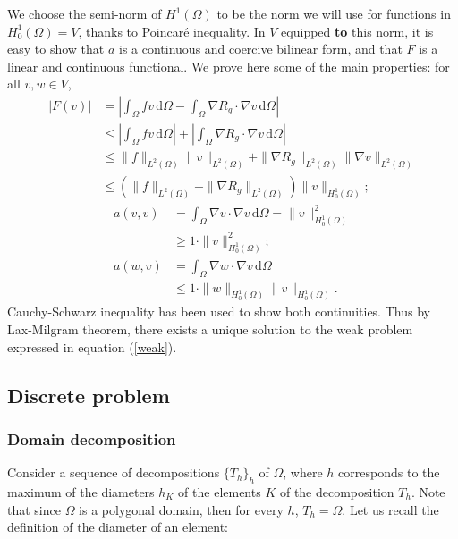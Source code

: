 We choose the semi-norm of $H^1(\Omega)$ to be the norm we will use for functions in $H^1_0(\Omega) = V$, thanks to Poincaré inequality. In $V$ equipped {\color{red}\textbf{to} this norm}, it is easy to show that $a$ is a continuous and coercive bilinear form, and that $F$ is a linear and continuous functional. We prove here some of the main properties: for all $v,w\in V$, 
\begin{align*}
\left|F(v)\right| &= \left|\int_\Omega fv \, \mathrm{d}\Omega -\int_\Omega \nabla R_g \cdot \nabla v \, \mathrm{d} \Omega\right| \\
& \leq \left|\int_\Omega fv \, \mathrm{d}\Omega\right| + \left|\int_\Omega \nabla R_g \cdot \nabla v \, \mathrm{d} \Omega\right|\\
& \leq \|f\|_{L^2(\Omega)}\|v\|_{L^2(\Omega)} + \|\nabla R_g\|_{L^2(\Omega)}\|\nabla v\|_{L^2(\Omega)}\\
& \leq \left(\|f\|_{L^2(\Omega)}+\|\nabla R_g\|_{L^2(\Omega)}\right)\|v\|_{H_0^1(\Omega)};
\end{align*}
\begin{align}
a(v,v) &= \int_\Omega \nabla v \cdot \nabla v \, \mathrm{d} \Omega = \|v\|^2_{H_0^1(\Omega)} \nonumber \\
& \geq 1\cdot \|v\|^2_{H_0^1(\Omega)}; \label{acoercive}\\
a(w,v) &= \int_\Omega \nabla w \cdot \nabla v \, \mathrm{d} \Omega \nonumber \\
& \leq 1 \cdot \|w\|_{H_0^1(\Omega)}\|v\|_{H_0^1(\Omega)}.\label{acontinue}
\end{align} 
Cauchy-Schwarz inequality has been used to show both continuities. Thus by Lax-Milgram theorem, there exists a unique solution to the weak problem expressed in equation (\ref{weak}). 


\subsection{Discrete problem}

\subsubsection{Domain decomposition}
Consider a sequence of decompositions $\{T_h\}_h$ of $\Omega$, where $h$ corresponds to the maximum of the diameters $h_K$ of the elements $K$ of the decomposition $T_h$. Note that since $\Omega$ is a polygonal domain, then for every $h$, $T_h = \Omega$. Let us recall the definition of the diameter of an element: 


